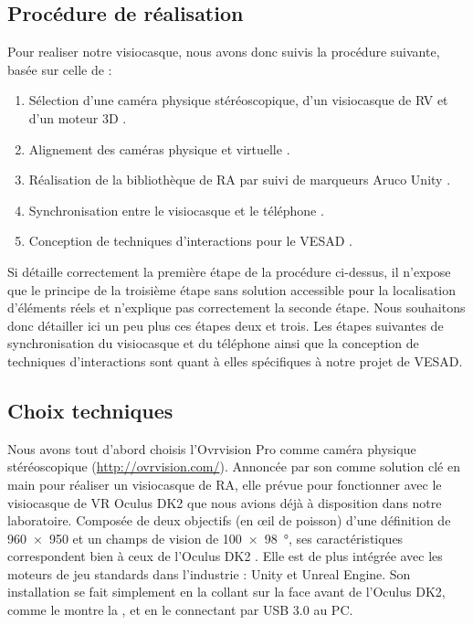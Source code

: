 \subsection{Procédure de réalisation}
\label{subsec:prototype_procedure}
Pour realiser notre visiocasque, nous avons donc suivis la procédure suivante, basée sur celle de \cite{Steptoe2013} :
\begin{enumerate}
  \item Sélection d'une caméra physique stéréoscopique, d'un visiocasque de RV et d'un moteur 3D .
  \item Alignement des caméras physique et virtuelle .
  \item Réalisation de la bibliothèque de RA par suivi de marqueurs Aruco Unity .
  \item Synchronisation entre le visiocasque et le téléphone .
  \item Conception de techniques d'interactions pour le VESAD .
\end{enumerate}

Si \citeauthor{Steptoe2013} détaille correctement la première étape de la procédure ci-dessus, il n'expose que le principe de la troisième étape sans solution accessible pour la localisation d'éléments réels et n'explique pas correctement la seconde étape. Nous souhaitons donc détailler ici un peu plus ces étapes deux et trois. Les étapes suivantes de synchronisation du visiocasque et du téléphone ainsi que la conception de techniques d'interactions sont quant à elles spécifiques à notre projet de VESAD.

\subsection{Choix techniques}
\label{subsec:technical_choices}
Nous avons tout d'abord choisis l'Ovrvision Pro comme caméra physique stéréoscopique (\url{http://ovrvision.com/}). Annoncée par son comme solution clé en main pour réaliser un visiocasque de RA, elle prévue pour fonctionner avec le visiocasque de VR Oculus DK2 que nous avions déjà à disposition dans notre laboratoire. Composée de deux objectifs  (en \oe il de poisson) d'une définition de \SI{960x950}{\px} et un champs de vision de \SI{100x98}{\degree}, ses caractéristiques correspondent  bien à ceux de l'Oculus DK2 . Elle est de plus intégrée avec les moteurs de jeu standards dans l'industrie : Unity et Unreal Engine. Son installation se fait simplement en la collant sur la face avant de l'Oculus DK2, comme le montre la , et en le connectant par USB 3.0 au PC.

